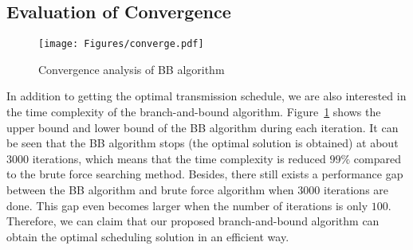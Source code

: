 \subsection{Evaluation of Convergence}
\begin{figure}
\begin{center}
\texttt{[image: Figures/converge.pdf]}
\caption{\label{fig::evaBBConvergence}Convergence analysis of BB algorithm}
\end{center}
\end{figure}
In addition to getting the optimal transmission schedule, we are also interested in the time complexity of the branch-and-bound algorithm.
Figure~\ref{fig::evaBBConvergence} shows the upper bound and lower bound of the BB algorithm during each iteration.
It can be seen that the BB algorithm stops (the optimal solution is obtained) at about  $3000$ iterations, which means that the time complexity is reduced $99\%$ compared to the brute force searching method.
Besides, there still exists a performance gap between the BB algorithm and brute force algorithm when $3000$ iterations are done.
This gap even becomes larger when the number of iterations is only $100$.
Therefore, we can claim that our proposed branch-and-bound algorithm can obtain the optimal scheduling solution in an efficient way.